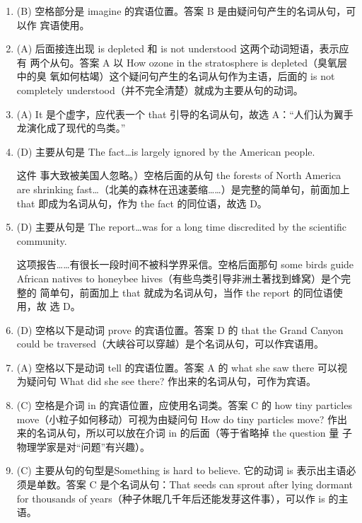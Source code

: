 \begin{enumerate}
\item (B) 空格部分是 imagine 的宾语位置。答案 B 是由疑问句产生的名词从句，可以作
  宾语使用。

\item (A) 后面接连出现 is depleted 和 is not understood 这两个动词短语，表示应有
  两个从句。答案 A 以 How ozone in the stratosphere is depleted（臭氧层中的臭
  氧如何枯竭）这个疑问句产生的名词从句作为主语，后面的 is not completely
  understood（并不完全清楚）就成为主要从句的动词。
\item (A) It 是个虚字，应代表一个 that 引导的名词从句，故选 A：“人们认为翼手龙演化成了现代的鸟类。”

\item (D) 主要从句是 The fact…is largely ignored by the American people.

这件
  事大致被美国人忽略。）空格后面的从句 the forests of North America are
  shrinking fast…（北美的森林在迅速萎缩……）是完整的简单句，前面加上 that
  即成为名词从句，作为 the fact 的同位语，故选 D。


\item (D) 主要从句是 The report…was for a long time discredited by the
  scientific community.

  这项报告……有很长一段时间不被科学界采信。空格后面那句 some birds guide
  African natives to honeybee hives（有些鸟类引导非洲土著找到蜂窝）是个完整的
  简单句，前面加上 that 就成为名词从句，当作 the report 的同位语使用，故
  选 D。

\item (D) 空格以下是动词 prove 的宾语位置。答案 D 的 that the Grand Canyon could be traversed（大峡谷可以穿越）是个名词从句，可以作宾语用。


\item  (A) 空格以下是动词 tell 的宾语位置。答案 A 的 what she saw there 可以视为疑问句 What did she see there? 作出来的名词从句，可作为宾语。


\item (C) 空格是介词 in 的宾语位置，应使用名词类。答案 C 的 how tiny
  particles move（小粒子如何移动）可视为由疑问句 How do tiny particles move?
  作出来的名词从句，所以可以放在介词 in 的后面（等于省略掉 the question 量
  子物理学家是对“问题”有兴趣）。


\item  (C) 主要从句的句型是Something is hard to believe. 它的动词 is 表示出主语必须是单数。答案 C 是个名词从句：That seeds can sprout after lying dormant for thousands of years（种子休眠几千年后还能发芽这件事），可以作 is 的主语。


\end{enumerate}
